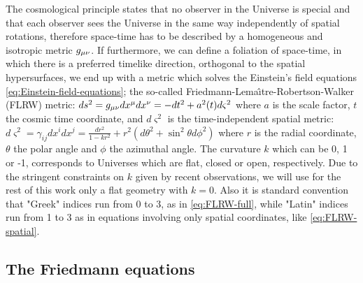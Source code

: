 The cosmological principle states
that no observer in the Universe is special and that each observer sees the Universe in the same way independently of
spatial rotations, therefore space-time has to be described by a homogeneous and isotropic metric $g_{\mu \nu}$.
If furthermore, we can define a foliation of space-time, in which there is a preferred timelike direction, orthogonal
to the spatial hypersurfaces, we end up with a metric which solves the Einstein's field equations \ref{eq:Einstein-field-equations};
the so-called Friedmann-Lema\^{\i}tre-Robertson-Walker (FLRW) metric:
\beeqc$\label{eq:FLRW-full}
ds^2 = g_{\mu \nu} dx^\mu dx^\nu = -dt^2 + a^2 (t) d\varsigma^2 
$
where $a$ is the scale factor, $t$ the cosmic time coordinate, and $d\varsigma^2$ is the time-independent spatial metric:
\beeqc$\label{eq:FLRW-spatial}
d\varsigma^2  = \gamma_{i j} dx^i dx^j = \frac{dr^2}{1-kr^2} + r^2(d\theta^2 + \sin^2 \theta d \phi^2)
$ 
where $r$ is the radial coordinate, $\theta$ the polar angle and $\phi$ the azimuthal angle.
The curvature $k$ which can be 0, 1 or -1, corresponds to Universes which are flat, closed or open, respectively.
Due to the stringent constraints on $k$ given by recent observations,
we will use for the rest of this work only a flat geometry with $k=0$.
Also it is standard convention that "Greek" indices run from 0 to 3, as in \cref{eq:FLRW-full},
while "Latin" indices run from 1 to 3 as in equations involving only spatial coordinates, like \cref{eq:FLRW-spatial}.


\subsection{The Friedmann equations \label{sub:Friedmann-eqs}}


